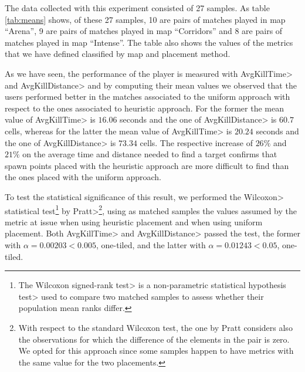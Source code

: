 The data collected with this experiment consisted of 27 samples. As table \ref{tab:means} shows, of these 27 samples, 10 are pairs of matches played in map ``Arena'', 9 are pairs of matches played in map ``Corridors'' and 8 are pairs of matches played in map ``Intense''. The table also shows the values of the metrics that we have defined classified by map and placement method.

\par

As we have seen, the performance of the player is measured with \<AvgKillTime> and \<AvgKillDistance> and by computing their mean values we observed that the users performed better in the matches associated to the uniform approach with respect to the ones associated to heuristic approach. For the former the mean value of \<AvgKillTime> is $16.06$ seconds and the one of \<AvgKillDistance> is $60.7$ cells, whereas for the latter the mean value of \<AvgKillTime> is $20.24$ seconds and the one of \<AvgKillDistance> is $73.34$ cells. The respective increase of $26\%$ and $21\%$ on the average time and distance needed to find a target confirms that spawn points placed with the heuristic approach are more difficult to find than the ones placed with the uniform approach.

\par

To test the statistical significance of this result, we performed the \<Wilcoxon> statistical test\footnote{The \<Wilcoxon signed-rank test> is a \<non-parametric statistical hypothesis test> used to compare two matched samples to assess whether their population mean ranks differ.} by \<Pratt>\footnote{With respect to the standard Wilcoxon test, the one by Pratt considers also the observations for which the difference of the elements in the pair is zero. We opted for this approach since some samples happen to have metrics with the same value for the two placements.}, using as matched samples the values assumed by the metric at issue when using heuristic placement and when using uniform placement. Both \<AvgKillTime> and  \<AvgKillDistance> passed the test, the former with $\alpha = 0.00203 < 0.005$, one-tiled, and the latter with $\alpha = 0.01243 < 0.05$, one-tiled.

